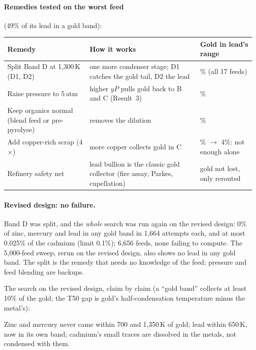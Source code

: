 \documentclass[11pt,a4paper]{article}
\begin{document}
\paragraph{Remedies tested on the worst feed} (49\% of its lead in a gold band):
\begin{center}
\small
\begin{tabular}{@{}>{\raggedright\arraybackslash}p{5cm}>{\raggedright\arraybackslash}p{6.2cm}>{\raggedright\arraybackslash}p{3.2cm}@{}}
\toprule
\textbf{Remedy} & \textbf{How it works} & \textbf{Gold in lead's range} \\
\midrule
Split Band D at 1,300\,K (D1, D2) & one more condenser stage; D1 catches the gold tail, D2 the lead & 0\% (all 17 feeds) \\
Raise pressure to 5\,atm & higher $yP$ pulls gold back to B and C (Result~3) & 0\% \\
Keep organics normal (blend feed or pre-pyrolyse) & removes the dilution & 0\% \\
Add copper-rich scrap (4$\times$) & more copper collects gold in C & 11\% $\to$ 4\%: not enough alone \\
Refinery safety net & lead bullion is the classic gold collector (fire assay, Parkes, cupellation) & gold not lost, only rerouted \\
\bottomrule
\end{tabular}
\end{center}

\paragraph{Revised design: no failure.} Band D was split, and the \emph{whole} search was run again on the revised design: 0\% of zinc, mercury and lead in any gold band in 1,664 attempts each, and at most 0.025\% of the cadmium (limit 0.1\%); 6,656 feeds, none failing to compute. The 5,000-feed sweep, rerun on the revised design, also shows no lead in any gold band. The split is the remedy that needs no knowledge of the feed; pressure and feed blending are backups.

\noindent The search on the revised design, claim by claim (a ``gold band'' collects at least 10\% of the gold; the T50 gap is gold's half-condensation temperature minus the metal's):

Zinc and mercury never came within 700 and 1,350\,K of gold; lead within 650\,K, now in its own band; cadmium's small traces are dissolved in the metals, not condensed with them.
\end{document}
